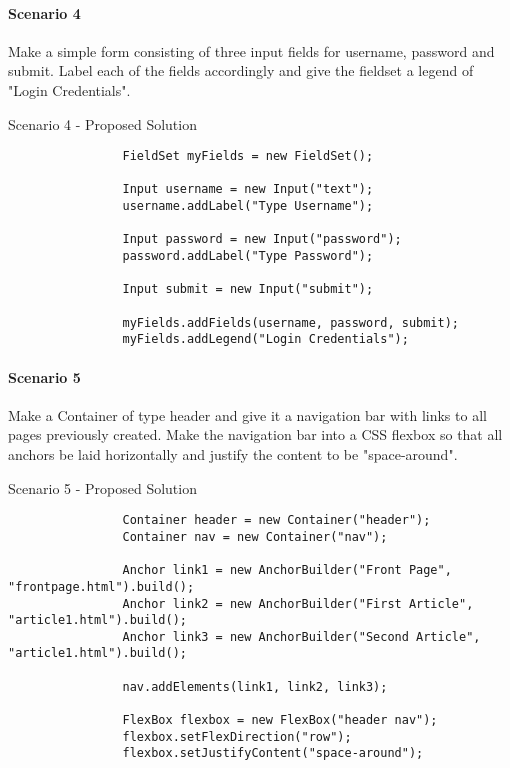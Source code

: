 \documentclass[12pt]{article}
\begin{document}
        \paragraph{Scenario 4}
        Make a simple form consisting of three input fields for username, password and submit. Label each of the fields accordingly and give the fieldset a legend of "Login Credentials".

        \begin{shaded}
            Scenario 4 - Proposed Solution
            \begin{lstlisting}
                FieldSet myFields = new FieldSet();

                Input username = new Input("text");
                username.addLabel("Type Username");
                
                Input password = new Input("password");
                password.addLabel("Type Password");
                
                Input submit = new Input("submit");

                myFields.addFields(username, password, submit);
                myFields.addLegend("Login Credentials");
            \end{lstlisting}
        \end{shaded}

        \paragraph{Scenario 5}
        Make a Container of type header and give it a navigation bar with links to all pages previously created. Make the navigation bar into a CSS flexbox so that all anchors be laid horizontally and justify the content to be "space-around".
        
        \begin{shaded}
            Scenario 5 - Proposed Solution
            \begin{lstlisting}
                Container header = new Container("header");
                Container nav = new Container("nav");

                Anchor link1 = new AnchorBuilder("Front Page", "frontpage.html").build();
                Anchor link2 = new AnchorBuilder("First Article", "article1.html").build();
                Anchor link3 = new AnchorBuilder("Second Article", "article1.html").build();

                nav.addElements(link1, link2, link3);

                FlexBox flexbox = new FlexBox("header nav");
                flexbox.setFlexDirection("row");
                flexbox.setJustifyContent("space-around");
            \end{lstlisting}
        \end{shaded}
\end{document}
